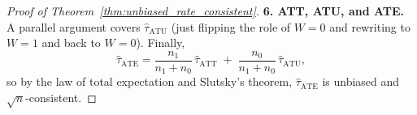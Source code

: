 \documentclass{article}
\theoremstyle{definition}
\begin{document}
\begin{proof}[Proof of Theorem~\ref{thm:unbiased_rate_consistent}]
\textbf{6. ATT, ATU, and ATE.}
A parallel argument covers $\hat{\tau}_{\text{ATU}}$ (just flipping the role of $W=0$ and rewriting to $W=1$ and back to $W=0$). Finally,
\[
\hat{\tau}_{\text{ATE}} = \frac{n_1}{n_1 + n_0}\,\hat{\tau}_{\text{ATT}} \;+\; \frac{n_0}{n_1 + n_0}\,\hat{\tau}_{\text{ATU}},
\]
so by the law of total expectation and Slutsky's theorem, $\hat{\tau}_{\text{ATE}}$ is unbiased and $\sqrt{n}$-consistent.  
\end{proof}

\newpage


\end{document}
